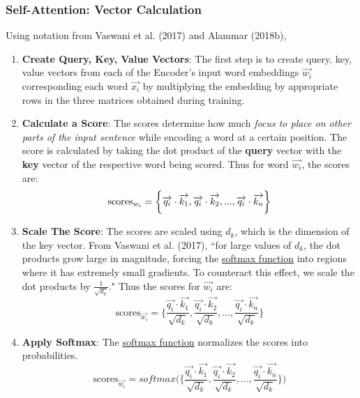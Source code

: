 \subsubsection{Self-Attention: Vector Calculation}

Using notation from Vaswani et al. (2017) and Alammar (2018b), 

\begin{enumerate}
    \item \textbf{Create Query, Key, Value Vectors}: The first step is to create query, key, value vectors from each of the Encoder's input word embeddings $\overrightarrow{w_i}$ corresponding each word $\overrightarrow{x_i}$ by multiplying the embedding by appropriate rows in the three matrices obtained during training.  

    \item \textbf{Calculate a Score}: The scores determine how much \emph{focus to place on other parts of the input sentence} while encoding a word at a certain position.  The score is calculated by taking the dot product of the \textbf{query} vector with the \textbf{key} vector of the respective word being scored. Thus for word $\overrightarrow{w_i}$, the scores are: 
    $$
    \text{scores}_{\Large w_i} = \bigg\{
    \overrightarrow{q_i} \cdot \overrightarrow{k_1},
    \overrightarrow{q_i} \cdot \overrightarrow{k_2},
    ...,
    \overrightarrow{q_i} \cdot \overrightarrow{k_n} \bigg\}
    $$

    \item \textbf{Scale The Score}: The scores are scaled using $d_k$, which is the dimension of the key vector. From Vaswani et al. (2017), ``for large values of $d_k$, the dot products grow large in  magnitude, forcing the \hyperref[cnc:softmaxLayer]{softmax function} into regions where it has extremely small gradients. To counteract this effect, we scale the dot products by $\frac {1} {\sqrt{d_k}}$." Thus the scores for $\overrightarrow{w_i}$ are:
    $$
    \text{scores}_{\overrightarrow{w_i}} = \Bigg\{
    \frac {\overrightarrow{q_i} \cdot \overrightarrow{k_1}} {\sqrt{d_k}},
    \frac {\overrightarrow{q_i} \cdot \overrightarrow{k_2}} {\sqrt{d_k}},
    ...,
    \frac{\overrightarrow{q_i} \cdot \overrightarrow{k_n}} {\sqrt{d_k}} \Bigg\}
    $$
    
    \item \textbf{Apply Softmax}: The \hyperref[cnc:softmaxLayer]{softmax function} normalizes the scores into probabilities. 
    $$
    \text{scores}_{\overrightarrow{w_i}} = softmax \Bigg( \Bigg\{
    \frac {\overrightarrow{q_i} \cdot \overrightarrow{k_1}} {\sqrt{d_k}},
    \frac {\overrightarrow{q_i} \cdot \overrightarrow{k_2}} {\sqrt{d_k}},
    ...,
    \frac{\overrightarrow{q_i} \cdot \overrightarrow{k_n}} {\sqrt{d_k}} \Bigg\} \Bigg)
    $$


\end{enumerate}
